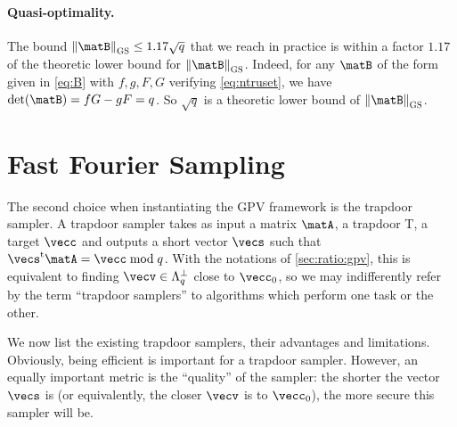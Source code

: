 

\paragraph{Quasi-optimality.}
The bound $\gsnorm{\matB} \leq 1.17 \sqrt{q}$ that we reach in practice is within a factor $1.17$ of the theoretic lower bound for $\gsnorm{\matB}$. Indeed, for any $\matB$ of the form given in \eqref{eq:B} with $f,g,F,G$ verifying \eqref{eq:ntruset}, we have $\det(\matB) = f G - g F = q$. So $\sqrt{q}$ is a theoretic lower bound of $\gsnorm{\matB}$.

\section{Fast Fourier Sampling}\label{sec:ratio:ffs}

The second choice when instantiating the GPV framework is the trapdoor sampler. A trapdoor sampler takes as input a matrix $\matA$, a trapdoor \textsf{T}, a target $\vecc$ and outputs a short vector $\vecs$ such that $\vecs^\t \matA = \vecc \bmod q$. With the notations of \cref{sec:ratio:gpv}, this is equivalent to finding $\vecv \in \Lambda_q^\perp$ close to $\vecc_0$, so we may indifferently refer by the term ``trapdoor samplers'' to algorithms which perform one task or the other. 

We now list the existing trapdoor samplers, their advantages and limitations. Obviously, being efficient is important for a trapdoor sampler. However, an equally important metric is the ``quality'' of the sampler: the shorter the vector $\vecs$ is (or equivalently, the closer $\vecv$ is to $\vecc_0$), the more secure this sampler will be.

